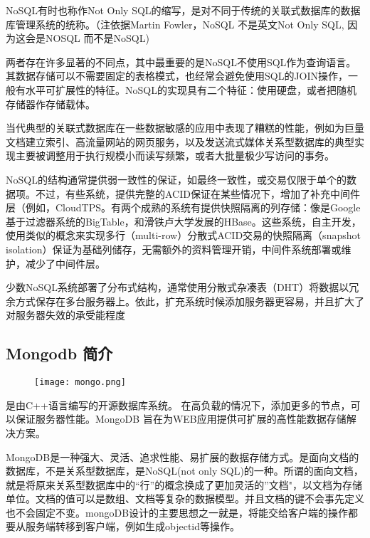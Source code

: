 NoSQL有时也称作Not Only SQL的缩写，是对不同于传统的关联式数据库的数据库管理系统的统称。（注依据Martin Fowler，NoSQL 不是英文Not Only SQL, 因为这会是NOSQL 而不是NoSQL)



两者存在许多显著的不同点，其中最重要的是NoSQL不使用SQL作为查询语言。其数据存储可以不需要固定的表格模式，也经常会避免使用SQL的JOIN操作，一般有水平可扩展性的特征。NoSQL的实现具有二个特征：使用硬盘，或者把随机存储器作存储载体。



当代典型的关联式数据库在一些数据敏感的应用中表现了糟糕的性能，例如为巨量文档建立索引、高流量网站的网页服务，以及发送流式媒体关系型数据库的典型实现主要被调整用于执行规模小而读写频繁，或者大批量极少写访问的事务。



NoSQL的结构通常提供弱一致性的保证，如最终一致性，或交易仅限于单个的数据项。不过，有些系统，提供完整的ACID保证在某些情况​​下，增加了补充中间件层（例如，CloudTPS。有两个成熟的系统有提供快照隔离的列存储：像是Google基于过滤器系统的BigTable，和滑铁卢大学发展的HBase。这些系统，自主开发，使用类似的概念来实现多行（multi-row）分散式ACID交易的快照隔离（snapshot isolation）保证为基础列储存，无需额外的资料管理开销，中间件系统部署或维护，减少了中间件层。



少数NoSQL系统部署了分布式结构，通常使用分散式杂凑表（DHT）将数据以冗余方式保存在多台服务器上。依此，扩充系统时候添加服务器更容易，并且扩大了对服务器失效的承受能程度


\subsection{Mongodb 简介}

\begin{figure}[H]
	\centering
	\texttt{[image: mongo.png]}
	\label{fig: mongo}
\end{figure}


	是由C++语言编写的开源数据库系统。 在高负载的情况下，添加更多的节点，可以保证服务器性能。MongoDB 旨在为WEB应用提供可扩展的高性能数据存储解决方案。
	
	
	
	MongoDB是一种强大、灵活、追求性能、易扩展的数据存储方式。是面向文档的数据库，不是关系型数据库，是NoSQL(not only SQL)的一种。所谓的面向文档，就是将原来关系型数据库中的“行”的概念换成了更加灵活的”文档"，以文档为存储单位。文档的值可以是数组、文档等复杂的数据模型。并且文档的键不会事先定义也不会固定不变。mongoDB设计的主要思想之一就是，将能交给客户端的操作都要从服务端转移到客户端，例如生成objectid等操作。
	
